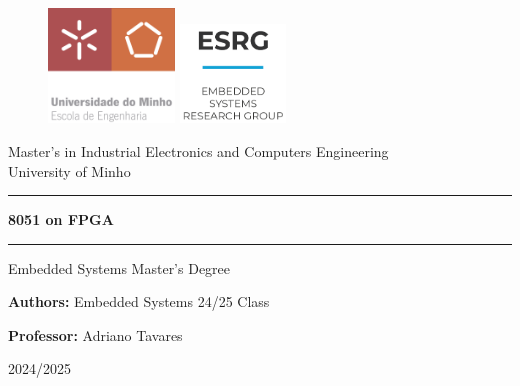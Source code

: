 \begin{figure}[h!]  %
    \centering
    \includegraphics[width=0.3\textwidth]{images/ENG-EN.png}  %
    \hspace{0.1cm}
    \includegraphics[width=0.25\textwidth]{images/Labs-ESRG-resized.png}  %
\end{figure}
\centering
\vspace{0.25in}
\large
Master’s in Industrial Electronics and Computers Engineering \\
\vspace{0.15in}
\LARGE
University of Minho\\
\vspace{0.35in}
\hrule

\vspace{0.2in}
\textbf{8051 on FPGA}
\vspace{0.2in}

\hrule
\vspace{0.2in}
\large
Embedded Systems Master's Degree
\vfill

\textbf{Authors:}
Embedded Systems 24/25 Class
\vspace{0.1in}

\textbf{Professor:}
Adriano Tavares
\vspace{0.25in}

2024/2025